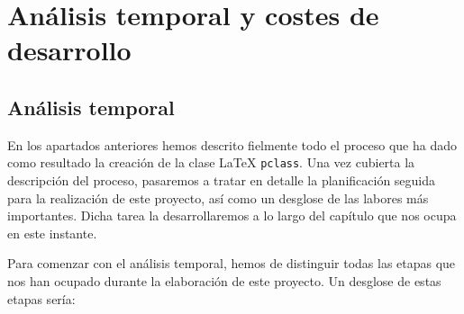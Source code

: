 \chapter{An\'alisis temporal y costes de desarrollo}\label{anatemporal}

\section{An\'alisis temporal}
	En los apartados anteriores hemos descrito fielmente todo el proceso que ha dado como resultado la creaci\'on 
	de la clase \LaTeX{} \texttt{pclass}. Una vez cubierta la descripci\'on del proceso, pasaremos a tratar en detalle
	la planificaci\'on seguida para la realizaci\'on de este proyecto, as\'i como un desglose de las labores m\'as 
	importantes. Dicha tarea la desarrollaremos a lo largo del cap\'itulo que nos ocupa en este instante.
	
	Para comenzar con el an\'alisis temporal, hemos de distinguir todas las etapas que nos han ocupado durante la 
	elaboraci\'on de este proyecto. Un desglose de estas etapas ser\'ia:
		
